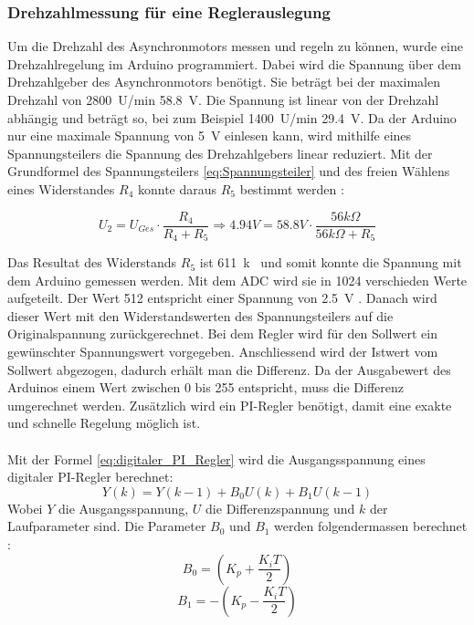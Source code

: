 \subsubsection{Drehzahlmessung für eine Reglerauslegung}
Um die Drehzahl des Asynchronmotors messen und regeln zu können, wurde eine Drehzahlregelung im Arduino programmiert. Dabei wird die Spannung über dem Drehzahlgeber des Asynchronmotors benötigt. Sie beträgt bei der maximalen Drehzahl von \SI{2800}{U/min} \SI{58.8}{V}. Die Spannung ist linear von der Drehzahl abhängig und beträgt so, bei zum Beispiel \SI{1400}{U/min} \SI{29.4}{V}. Da der Arduino nur eine maximale Spannung von \SI{5}{V} einlesen kann, wird mithilfe eines Spannungsteilers die Spannung des Drehzahlgebers linear reduziert. Mit der Grundformel des Spannungsteilers \ref{eq:Spannungsteiler} und des freien Wählens eines Widerstandes $R_4$ konnte daraus $R_5$ bestimmt werden \cite{Spannungsteiler}:

\begin{equation}\label{eq:Spannungsteiler}
U_2=U_{Ges} \cdot\frac{R_4}{R_4 + R_5} \Longrightarrow 4.94 V = 58.8 V \cdot \frac{56k\Omega}{56k\Omega + R_5}
\end{equation}

Das Resultat des Widerstands $R_5$ ist \SI{611}{k\Omega} und somit konnte die Spannung mit dem Arduino gemessen werden. Mit dem ADC wird sie in 1024 verschieden Werte aufgeteilt. Der Wert 512 entspricht  einer Spannung von \SI{2.5}{V} \cite{Spannungsmessung}. Danach wird dieser Wert mit den Widerstandswerten des Spannungsteilers auf die Originalspannung zurückgerechnet. Bei dem Regler wird für den Sollwert ein gewünschter Spannungswert vorgegeben. Anschliessend wird der Istwert vom Sollwert abgezogen, dadurch erhält man die Differenz. Da der Ausgabewert des Arduinos einem Wert zwischen 0 bis 255 entspricht, muss die Differenz umgerechnet werden. Zusätzlich wird ein PI-Regler benötigt, damit eine exakte und schnelle Regelung möglich ist.\\\\
Mit der Formel \ref{eq:digitaler_PI_Regler} wird die Ausgangsspannung eines digitaler PI-Regler berechnet: \cite{Quelle_Marco} 
\begin{equation}\label{eq:digitaler_PI_Regler}
Y(k) = Y(k-1)+ B_0U(k)+B_1U(k-1)
\end{equation}
Wobei $Y$ die Ausgangsspannung, $U$ die Differenzspannung und $k$ der Laufparameter sind. Die Parameter $B_0$ und $B_1$ werden folgendermassen berechnet \cite{PI_Regler}:
\begin{equation}\label{eq:B0}
B_0 = \left(K_p + \frac{K_iT}{2}\right) 
\end{equation}
\begin{equation}\label{eq:B1}
B_1 = -\left(K_p - \frac{K_iT}{2}\right) 
\end{equation}

